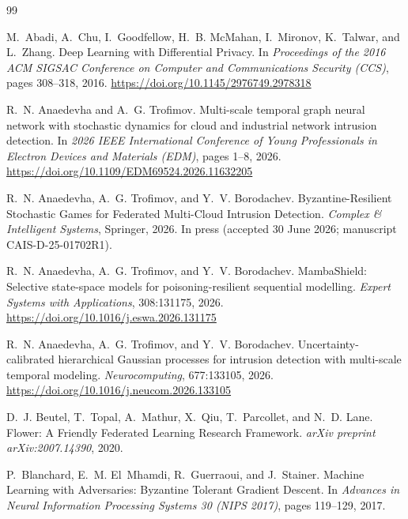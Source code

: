 \begin{thebibliography}{99}
\small

M.~Abadi, A.~Chu, I.~Goodfellow, H.~B. McMahan, I.~Mironov, K.~Talwar, and L.~Zhang.
\newblock Deep Learning with Differential Privacy.
\newblock In \emph{Proceedings of the 2016 ACM SIGSAC Conference on Computer and Communications Security (CCS)}, pages 308--318, 2016.
\newblock \url{https://doi.org/10.1145/2976749.2978318}

R.~N. Anaedevha and A.~G. Trofimov.
\newblock Multi-scale temporal graph neural network with stochastic dynamics for cloud and industrial network intrusion detection.
\newblock In \emph{2026 IEEE International Conference of Young Professionals in Electron Devices and Materials (EDM)}, pages 1--8, 2026.
\newblock \url{https://doi.org/10.1109/EDM69524.2026.11632205}

R.~N. Anaedevha, A.~G. Trofimov, and Y.~V. Borodachev.
\newblock Byzantine-Resilient Stochastic Games for Federated Multi-Cloud Intrusion Detection.
\newblock \emph{Complex \& Intelligent Systems}, Springer, 2026. In press (accepted 30 June 2026; manuscript CAIS-D-25-01702R1).

R.~N. Anaedevha, A.~G. Trofimov, and Y.~V. Borodachev.
\newblock MambaShield: Selective state-space models for poisoning-resilient sequential modelling.
\newblock \emph{Expert Systems with Applications}, 308:131175, 2026.
\newblock \url{https://doi.org/10.1016/j.eswa.2026.131175}

R.~N. Anaedevha, A.~G. Trofimov, and Y.~V. Borodachev.
\newblock Uncertainty-calibrated hierarchical Gaussian processes for intrusion detection with multi-scale temporal modeling.
\newblock \emph{Neurocomputing}, 677:133105, 2026.
\newblock \url{https://doi.org/10.1016/j.neucom.2026.133105}

D.~J. Beutel, T.~Topal, A.~Mathur, X.~Qiu, T.~Parcollet, and N.~D. Lane.
\newblock Flower: A Friendly Federated Learning Research Framework.
\newblock \emph{arXiv preprint arXiv:2007.14390}, 2020.

P.~Blanchard, E.~M. El~Mhamdi, R.~Guerraoui, and J.~Stainer.
\newblock Machine Learning with Adversaries: Byzantine Tolerant Gradient Descent.
\newblock In \emph{Advances in Neural Information Processing Systems 30 (NIPS 2017)}, pages 119--129, 2017.


\end{thebibliography}
